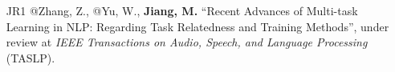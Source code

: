\documentclass[10pt]{article}
\newenvironment{myindentpar}[1]%
{\begin{list}{}%
         {\setlength{\leftmargin}{#1}}%
         \item[]%
}
{\end{list}}
\newcounter{list}
\begin{document}
\begin{myindentpar}{0.00cm}
\begin{enumerate}[leftmargin=.5cm]
\item[JR1] @Zhang, Z., @Yu, W., \textbf{Jiang, M.} ``Recent Advances of Multi-task Learning in NLP: Regarding Task Relatedness and Training Methods'', under review at \textit{IEEE Transactions on Audio, Speech, and Language Processing} (TASLP).




\end{enumerate}











\end{myindentpar}
\end{document}
